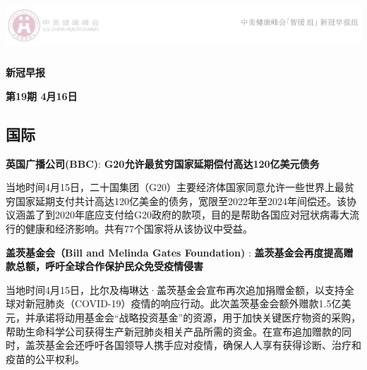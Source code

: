 \documentclass[]{article}
\author{}
\date{\vspace{-2.5em}}
\begin{document}
\fontsize{22}{22}
\selectfont
\vspace{-10truemm}

\newcommand{\resheading}[1]{%
  \noindent\fcolorbox{lavenderblush}{lavenderblush}{\makebox[\dimexpr\textwidth-2\fboxsep-2\fboxrule][l]{\textbf{~#1}}}%
}

\begin{center}
\includegraphics[height=2cm]{./input/logo2.png} 
\end{center}

\begin{center}
\fontsize{45}{45}
\textcolor{glaucous}{\textbf{新冠早报}}
\end{center}

\begin{center}
\fontsize{22}{22}
{\textcolor{glaucous}{\textbf{第19期 \space 4月16日}}}
\end{center}

%
  \noindent{}%

\hypertarget{section}{%
\subsection{\texorpdfstring{\textcolor{glaucous}{\Huge 国际}}{}}\label{section}}

\textbf{\textcolor{glaucous}{英国广播公司(BBC)}}:
\textbf{G20允许最贫穷国家延期偿付高达120亿美元债务 }

当地时间4月15日，二十国集团（G20）主要经济体国家同意允许一些世界上最贫穷国家延期支付共计高达120亿美金的债务，宽限至2022年至2024年间偿还。该协议涵盖了到2020年底应支付给G20政府的款项，目的是帮助各国应对冠状病毒大流行的健康和经济影响。共有77个国家将从该协议中受益。

\textbf{\textcolor{glaucous}{盖茨基金会（Bill and Melinda Gates Foundation)}}
: \textbf{盖茨基金会再度提高赠款总额，呼吁全球合作保护民众免受疫情侵害}

当地时间4月15日，比尔及梅琳达·盖茨基金会宣布再次追加捐赠金额，以支持全球对新冠肺炎（COVID-19）疫情的响应行动。此次盖茨基金会额外赠款1.5亿美元，并承诺将动用基金会``战略投资基金''的资源，用于加快关键医疗物资的采购，帮助生命科学公司获得生产新冠肺炎相关产品所需的资金。在宣布追加赠款的同时，盖茨基金会还呼吁各国领导人携手应对疫情，确保人人享有获得诊断、治疗和疫苗的公平权利。
\end{document}
